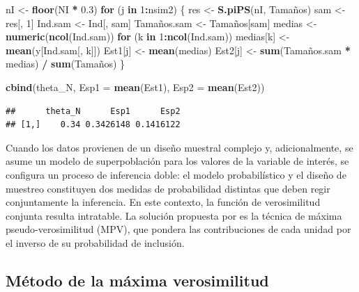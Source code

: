 \documentclass[
  spanish,
  12pt,
]{book}
\newenvironment{Shaded}{\begin{snugshade}}{\end{snugshade}}
\newcommand{\AttributeTok}[1]{\textcolor[rgb]{0.13,0.29,0.53}{#1}}
\newcommand{\ControlFlowTok}[1]{\textcolor[rgb]{0.13,0.29,0.53}{\textbf{#1}}}
\newcommand{\DecValTok}[1]{\textcolor[rgb]{0.00,0.00,0.81}{#1}}
\newcommand{\FloatTok}[1]{\textcolor[rgb]{0.00,0.00,0.81}{#1}}
\newcommand{\FunctionTok}[1]{\textcolor[rgb]{0.13,0.29,0.53}{\textbf{#1}}}
\newcommand{\NormalTok}[1]{#1}
\newcommand{\OtherTok}[1]{\textcolor[rgb]{0.56,0.35,0.01}{#1}}
\newcommand{\SpecialCharTok}[1]{\textcolor[rgb]{0.81,0.36,0.00}{\textbf{#1}}}
\begin{document}
\begin{Shaded}
\begin{Highlighting}[]
\NormalTok{nI }\OtherTok{\textless{}{-}} \FunctionTok{floor}\NormalTok{(NI }\SpecialCharTok{*} \FloatTok{0.3}\NormalTok{)}
\ControlFlowTok{for}\NormalTok{ (j }\ControlFlowTok{in} \DecValTok{1}\SpecialCharTok{:}\NormalTok{nsim2) \{}
\NormalTok{  res        }\OtherTok{\textless{}{-}} \FunctionTok{S.piPS}\NormalTok{(nI, Tamaños)}
\NormalTok{  sam        }\OtherTok{\textless{}{-}}\NormalTok{ res[, }\DecValTok{1}\NormalTok{]}
\NormalTok{  Ind.sam    }\OtherTok{\textless{}{-}}\NormalTok{ Ind[, sam]}
\NormalTok{  Tamaños.sam }\OtherTok{\textless{}{-}}\NormalTok{ Tamaños[sam]}
\NormalTok{  medias     }\OtherTok{\textless{}{-}} \FunctionTok{numeric}\NormalTok{(}\FunctionTok{ncol}\NormalTok{(Ind.sam))}
  \ControlFlowTok{for}\NormalTok{ (k }\ControlFlowTok{in} \DecValTok{1}\SpecialCharTok{:}\FunctionTok{ncol}\NormalTok{(Ind.sam)) medias[k] }\OtherTok{\textless{}{-}} \FunctionTok{mean}\NormalTok{(y[Ind.sam[, k]])}
\NormalTok{  Est1[j] }\OtherTok{\textless{}{-}} \FunctionTok{mean}\NormalTok{(medias)}
\NormalTok{  Est2[j] }\OtherTok{\textless{}{-}} \FunctionTok{sum}\NormalTok{(Tamaños.sam }\SpecialCharTok{*}\NormalTok{ medias) }\SpecialCharTok{/} \FunctionTok{sum}\NormalTok{(Tamaños)}
\NormalTok{\}}

\FunctionTok{cbind}\NormalTok{(theta\_N, }\AttributeTok{Esp1 =} \FunctionTok{mean}\NormalTok{(Est1), }\AttributeTok{Esp2 =} \FunctionTok{mean}\NormalTok{(Est2))}
\end{Highlighting}
\end{Shaded}

\begin{verbatim}
##      theta_N      Esp1      Esp2
## [1,]    0.34 0.3426148 0.1416122
\end{verbatim}

Cuando los datos provienen de un diseño muestral complejo y, adicionalmente, se asume un modelo de superpoblación para los valores de la variable de interés, se configura un proceso de inferencia doble: el modelo probabilístico y el diseño de muestreo constituyen dos medidas de probabilidad distintas que deben regir conjuntamente la inferencia. En este contexto, la función de verosimilitud conjunta resulta intratable. La solución propuesta por \citet{pfeffermann1993role} es la técnica de máxima pseudo-verosimilitud (MPV), que pondera las contribuciones de cada unidad por el inverso de su probabilidad de inclusión.

\subsection{Método de la máxima verosimilitud}\label{sec-mv}
\end{document}
